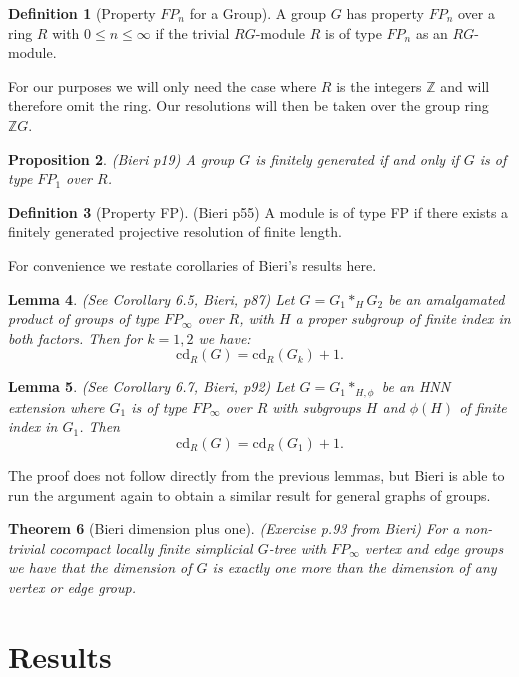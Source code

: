 \documentclass[12pt,parskip=full]{report}
\theoremstyle{plain}
\newtheorem{thm}{Theorem}[section]
\newtheorem{lem}[thm]{Lemma}
\newtheorem{prop}[thm]{Proposition}
\theoremstyle{definition}
\newtheorem{dfn}[thm]{Definition}
\begin{document}
\begin{dfn}
[Property \(FP_n\) for a Group]

A group \(G\) has property \(FP_n\) over a ring \(R\) with \(0\leq n\leq \infty\) if the trivial \(RG\)-module \(R\) is of type \(FP_n\) as an \(RG\)-module.
\end{dfn}

For our purposes we will only need the case where \(R\) is the integers \(\mathbb{Z}\) and will therefore omit the ring. Our resolutions will then be taken over the group ring \(\mathbb{Z}G\).

\begin{prop}
(Bieri p19)
A group \(G\) is finitely generated if and only if \(G\) is of type \(FP_1\) over \(R\).
\end{prop}

\begin{dfn}
[Property FP]
(Bieri p55)
A module is of type FP if there exists a finitely generated projective resolution of finite length.
\end{dfn}

For convenience we restate corollaries of Bieri's results here.
\begin{lem}
(See Corollary 6.5, Bieri, p87)
Let \(G=G_1\ast_H G_2\) be an amalgamated product of groups of type \(FP_\infty\) over \(R\), with \(H\) a proper subgroup of finite index in both factors. Then for \(k=1,2\) we have: \[\text{cd}_R(G)=\text{cd}_R(G_k)+1.\]
\end{lem}

\begin{lem}
(See Corollary 6.7, Bieri, p92)
Let \(G=G_1\ast_{H,\phi}\) be an HNN extension where \(G_1\) is of type \(FP_\infty\) over \(R\) with subgroups \(H\) and \(\phi(H)\) of finite index in \(G_1\). Then \[\text{cd}_R(G) = \text{cd}_R(G_1)+1.\]
\end{lem}

The proof does not follow directly from the previous lemmas, but Bieri is able to run the argument again to obtain a similar result for general graphs of groups.
\begin{thm}
    [Bieri dimension plus one]
    \label{pro:bireridimension}
    (Exercise p.93 from Bieri)
    For a non-trivial cocompact locally finite simplicial \(G\)-tree with \(FP_\infty\) vertex and edge groups we have that the dimension of \(G\) is exactly one more than the dimension of any vertex or edge group.
\end{thm}

\chapter{Results}
\end{document}
